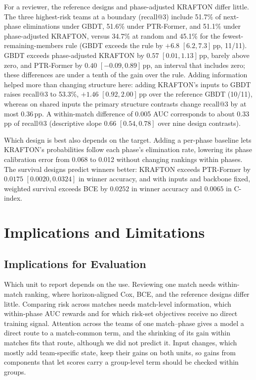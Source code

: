 \documentclass[sigconf,anonymous]{acmart}
\begin{document}
For a reviewer, the reference designs and phase-adjusted KRAFTON differ little. The three highest-risk teams at a boundary (recall@3) include 51.7\% of next-phase eliminations under GBDT, 51.6\% under PTR-Former, and 51.1\% under phase-adjusted KRAFTON, versus 34.7\% at random and 45.1\% for the fewest-remaining-members rule (GBDT exceeds the rule by $+6.8$ $[6.2,\allowbreak 7.3]$\,pp, 11/11). GBDT exceeds phase-adjusted KRAFTON by $0.57$ $[0.01,\allowbreak 1.13]$\,pp, barely above zero, and PTR-Former by $0.40$ $[-0.09,\allowbreak 0.89]$\,pp, an interval that includes zero; these differences are under a tenth of the gain over the rule. Adding information helped more than changing structure here: adding KRAFTON's inputs to GBDT raises recall@3 to 53.3\%, $+1.46$ $[0.92,\allowbreak 2.00]$\,pp over the reference GBDT (10/11), whereas on shared inputs the primary structure contrasts change recall@3 by at most 0.36\,pp. A within-match difference of 0.005 AUC corresponds to about 0.33\,pp of recall@3 (descriptive slope 0.66 $[0.54,\allowbreak 0.78]$ over nine design contrasts).

Which design is best also depends on the target. Adding a per-phase baseline lets KRAFTON's probabilities follow each phase's elimination rate, lowering its phase calibration error from 0.068 to 0.012 without changing rankings within phases. The survival designs predict winners better: KRAFTON exceeds PTR-Former by $0.0175$ $[0.0020,\allowbreak 0.0324]$ in winner accuracy, and with inputs and backbone fixed, weighted survival exceeds BCE by $0.0252$ in winner accuracy and $0.0065$ in C-index.

\section{Implications and Limitations}
\label{sec:discussion}
\subsection{Implications for Evaluation}
\label{sec:discussion:implications}
Which unit to report depends on the use. Reviewing one match needs within-match ranking, where horizon-aligned Cox, BCE, and the reference designs differ little. Comparing risk across matches needs match-level information, which within-phase AUC rewards and for which risk-set objectives receive no direct training signal. Attention across the teams of one match--phase gives a model a direct route to a match-common term, and the shrinking of its gain within matches fits that route, although we did not predict it. Input changes, which mostly add team-specific state, keep their gains on both units, so gains from components that let scores carry a group-level term should be checked within groups.
\end{document}
